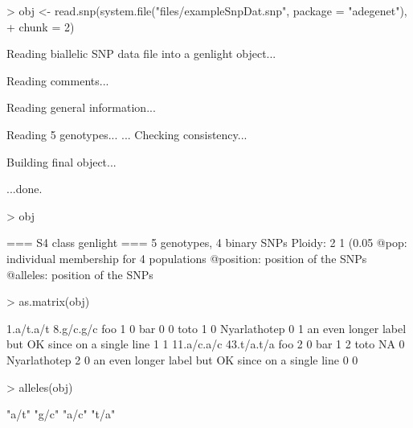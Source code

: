 \documentclass{article}
\begin{document}
\begin{Schunk}
\begin{Sinput}
> obj <- read.snp(system.file("files/exampleSnpDat.snp", package = "adegenet"), 
+     chunk = 2)
\end{Sinput}
\begin{Soutput}
 Reading biallelic SNP data file into a genlight object... 


 Reading comments... 

 Reading general information... 

 Reading 5 genotypes... 
...
 Checking consistency... 

 Building final object... 

...done.
\end{Soutput}
\begin{Sinput}
> obj
\end{Sinput}
\begin{Soutput}
 === S4 class genlight ===
 5 genotypes,  4 binary SNPs
 Ploidy: 2
 1 (0.05 %) missing data
 @pop: individual membership for 4 populations
 @position: position of the SNPs
 @alleles: position of the SNPs
\end{Soutput}
\begin{Sinput}
> as.matrix(obj)
\end{Sinput}
\begin{Soutput}
                                                   1.a/t.a/t 8.g/c.g/c
foo                                                        1         0
bar                                                        0         0
toto                                                       1         0
Nyarlathotep                                               0         1
an even longer label but OK since on a single line         1         1
                                                   11.a/c.a/c 43.t/a.t/a
foo                                                         2          0
bar                                                         1          2
toto                                                       NA          0
Nyarlathotep                                                2          0
an even longer label but OK since on a single line          0          0
\end{Soutput}
\begin{Sinput}
> alleles(obj)
\end{Sinput}
\begin{Soutput}
[1] "a/t" "g/c" "a/c" "t/a"
\end{Soutput}
\begin{Sinput}

\end{Sinput}
\end{Schunk}
\end{document}
